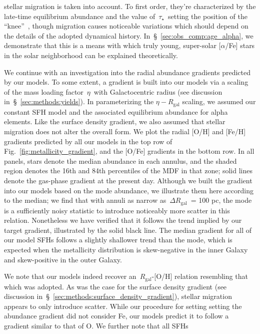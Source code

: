 \documentclass[fleqn, usenatbib]{mnras}
\begin{document}
stellar migration is taken into account. To first order, they're characterized 
by the late-time equilibrium abundance and the value of~$\tau_\star$~setting 
the position of the ``knee''~\citep{Weinberg2017}, though migration causes 
noticeable variations which should depend on the details of the adopted 
dynamical history. In~\S~\ref{sec:obs_comp:age_alpha}, we demonstrate that 
this is a means with which truly young, super-solar [$\alpha$/Fe] stars in the 
solar neighborhood can be explained theoretically. 
\par 
We continue with an investigation into the radial abundance gradients predicted 
by our models. To some extent, a gradient is built into our models via a 
scaling of the mass loading factor~$\eta$~with Galactocentric radius (see 
discussion in~\S~\ref{sec:methods:yields}). In parameterizing the 
$\eta-R_\text{gal}$ scaling, we assumed our constant SFH model and the 
associated equilibrium abundance for alpha elements. Like the surface density 
gradient, we also assumed that stellar migration does not alter the overall 
form. We plot the radial [O/H] and [Fe/H] gradients predicted by all our 
models in the top row of Fig.~\ref{fig:metallicity_gradient}, and the [O/Fe] 
gradients in the bottom row. In all panels, stars denote the median abundance 
in each annulus, and the shaded region denotes the 16th and 84th percentiles of 
the MDF in that zone; solid lines denote the gas-phase gradient at the present 
day. Although we built the gradient into our models based on the mode abundance, 
we illustrate them here according to the median; we find that with annuli as 
narrow as~$\Delta R_\text{gal}$~= 100 pc, the mode is a sufficiently noisy 
statistic to introduce noticeably more scatter in this relation. Nonetheless we 
have verified that it follows the trend implied by our target gradient, 
illustrated by the solid black line. The median gradient for all of our model 
SFHs follows a slightly shallower trend than the mode, which is expected when 
the metallicity distribution is skew-negative in the inner Galaxy and 
skew-positive in the outer Galaxy. 
\par 
We note that our models indeed recover an~$R_\text{gal}$-[O/H] relation 
resembling that which was adopted. As was the case for the surface density 
gradient (see discussion in~\S~\ref{sec:methods:surface_density_gradient}), 
stellar migration appears to only introduce scatter. While our procedure for 
setting setting the abundance gradient did not consider Fe, our models predict 
it to follow a gradient similar to that of O. We further note that all SFHs 
\end{document}

